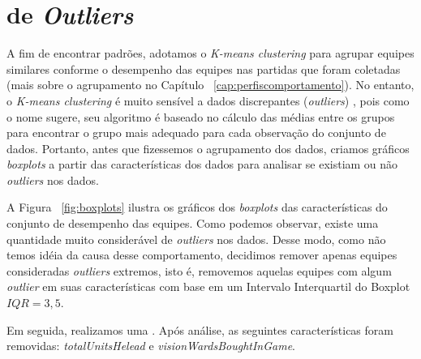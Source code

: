 \section{ de \textit{Outliers}}

A fim de encontrar padrões, adotamos o \textit{K-means clustering} para agrupar equipes similares conforme o desempenho das equipes nas partidas que foram coletadas (mais sobre o agrupamento no Capítulo ~\ref{cap:perfiscomportamento}). No entanto, o \textit{K-means clustering} é muito sensível a dados discrepantes (\textit{outliers}) \cite{gan2017k}, pois como o nome sugere, seu algoritmo é baseado no cálculo das médias entre os grupos para encontrar o grupo mais adequado para cada observação do conjunto de dados. Portanto, antes que fizessemos o agrupamento dos dados, criamos gráficos \textit{boxplots} a partir das características dos dados para analisar se existiam ou não \textit{outliers} nos dados.


A Figura ~\ref{fig:boxplots} ilustra os gráficos dos \textit{boxplots} das caracter\'isticas do conjunto de desempenho das equipes. Como podemos observar, existe uma quantidade muito considerável de \textit{outliers} nos dados. Desse modo, como não temos idéia da causa desse comportamento, decidimos remover apenas equipes consideradas \textit{outliers} extremos, isto é, removemos aquelas equipes com algum \textit{outlier} em suas caracter\'isticas com base em um Intervalo Interquartil do Boxplot $IQR = 3,5$.

Em seguida, realizamos uma . Após  análise, as seguintes características  foram removidas: \textit{totalUnitsHelead} e \textit{visionWardsBoughtInGame}.

